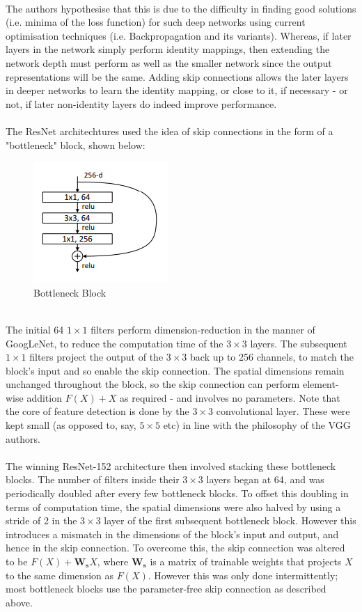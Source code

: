 \documentclass[11pt]{article} %
\theoremstyle{plain}
\theoremstyle{definition}
\begin{document}
\\
\noindent
The authors hypothesise that this is due to the difficulty in finding good solutions (i.e. minima of the loss function) for such deep networks using current optimisation techniques (i.e. Backpropagation and its variants). Whereas, if later layers in the network simply perform identity mappings, then extending the network depth must perform as well as the smaller network since the output representations will be the same. Adding skip connections allows the later layers in deeper networks to learn the identity mapping, or close to it, if necessary - or not, if later non-identity layers do indeed improve performance.
\\
\\
\noindent
The ResNet architechtures used the idea of skip connections in the form of a "bottleneck" block, shown below:
\begin{figure}[!ht]
  \centering    
  \caption{Bottleneck Block}
  \label{fig:ResNet_Bottleneck}
  \includegraphics[scale=0.7]{ResNet_Bottleneck.PNG}
\end{figure}
\\
\noindent
The initial 64 \(1 \times 1\) filters perform dimension-reduction in the manner of GoogLeNet, to reduce the computation time of the \(3 \times 3\) layers. The subsequent \(1 \times 1\) filters project the output of the \(3 \times 3\) back up to 256 channels, to match the block's input and so enable the skip connection. The spatial dimensions remain unchanged throughout the block, so the skip connection can perform element-wise addition \(F(X) + X\) as required - and involves no parameters. Note that the core of feature detection is done by the \(3 \times 3\) convolutional layer. These were kept small (as opposed to, say, \(5 \times 5\) etc) in line with the philosophy of the VGG authors.
\\
\\
\noindent
The winning ResNet-152 architecture then involved stacking these bottleneck blocks. The number of filters inside their \(3 \times 3\) layers began at 64, and was periodically doubled after every few bottleneck blocks. To offset this doubling in terms of computation time, the spatial dimensions were also halved by using a stride of 2 in the \(3 \times 3\) layer of the first subsequent bottleneck block. However this introduces a mismatch in the dimensions of the block's input and output, and hence in the skip connection. To overcome this, the skip connection was altered to be \(F(X) + \mathbf{W_s}X\), where \(\mathbf{W_s}\) is a matrix of trainable weights that projects \(X\) to the same dimension as \(F(X)\). However this was only done intermittently; most bottleneck blocks use the parameter-free skip connection as described above.   
\end{document}
